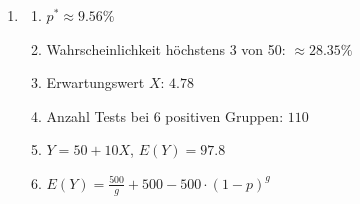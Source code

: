 \begin{enumerate}
\begin{enumerate}
              \item
                    \begin{enumerate}
                        \item \dots
                        \item \dots
                        \item Wahrscheinlichkeit Wechsel an gegebener Stelle: \(50\%\)
                        \item Erwartungswert Wechsel: \(24.5\), Runs: \(25.5\)
                    \end{enumerate}

              \item 90\%-Vorhersageintervall für Wechsel: \(19 \le X \le 30\).
          \end{enumerate}

    \item
          \begin{enumerate}
              \item \(p^* \approx 9.56\%\)
              \item Wahrscheinlichkeit höchstens 3 von 50: \(\approx 28.35\%\)
              \item Erwartungswert \(X\): \(4.78\)
              \item Anzahl Tests bei 6 positiven Gruppen: \(110\)
              \item \(Y = 50 + 10X\), \(E(Y) = 97.8\)
              \item \(E(Y) = \frac{500}{g} + 500 - 500 \cdot (1-p)^g\)
          \end{enumerate}
\end{enumerate}



